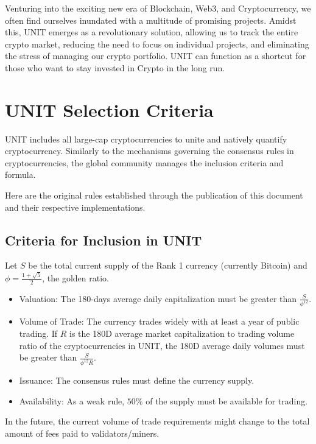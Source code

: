\documentclass[12pt]{article}
\begin{document}
Venturing into the exciting new era of Blockchain, Web3, and Cryptocurrency, we often find ourselves inundated with a multitude of promising projects. Amidst this, UNIT emerges as a revolutionary solution, allowing us to track the entire crypto market, reducing the need to focus on individual projects, and eliminating the stress of managing our crypto portfolio. UNIT can function as a shortcut for those who want to stay invested in Crypto in the long run.

\section{UNIT Selection Criteria}

UNIT includes all large-cap cryptocurrencies to unite and natively quantify cryptocurrency. Similarly to the mechanisms governing the consensus rules in cryptocurrencies, the global community manages the inclusion criteria and formula.

Here are the original rules established through the publication of this document and their respective implementations. 

\subsection{Criteria for Inclusion in UNIT}

Let $S$ be the total current supply of the Rank 1 currency (currently Bitcoin) and $\displaystyle{\phi =\frac{1+\sqrt{5}}{2}}$, the golden ratio.

\begin{itemize}

\item Valuation: The 180-days average daily capitalization must be greater than $\displaystyle{\frac{S}{\phi^{12}}}$.
\item Volume of Trade: The currency trades widely with at least a year of public trading. If $R$ is the 180D average market capitalization to trading volume ratio of the cryptocurrencies in UNIT, the 180D average daily volumes must be greater than $\displaystyle{\frac{S}{\phi^{12}R}}$.
\item Issuance: The consensus rules must define the currency supply.
\item Availability: As a weak rule, $50\%$ of the supply must be available for trading.

\end{itemize}

In the future, the current volume of trade requirements might change to the total amount of fees paid to validators/miners.
\end{document}
